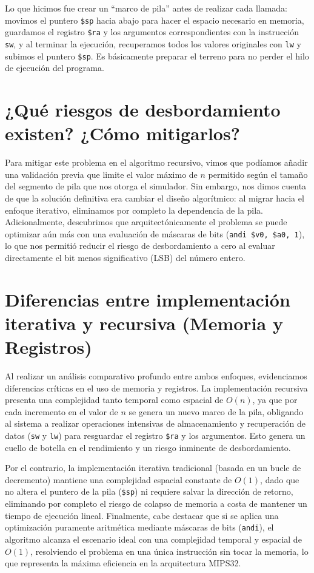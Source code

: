 \documentclass[12pt,letterpaper]{article}
\begin{document}
Lo que hicimos fue crear un ``marco de pila'' antes de realizar cada llamada: movimos el puntero \texttt{\$sp} hacia abajo para hacer el espacio necesario en memoria, guardamos el registro \texttt{\$ra} y los argumentos correspondientes con la instrucción \texttt{sw}, y al terminar la ejecución, recuperamos todos los valores originales con \texttt{lw} y subimos el puntero \texttt{\$sp}. Es básicamente preparar el terreno para no perder el hilo de ejecución del programa.

\section{¿Qué riesgos de desbordamiento existen? ¿Cómo mitigarlos?}
Para mitigar este problema en el algoritmo recursivo, vimos que podíamos añadir una validación previa que limite el valor máximo de $n$ permitido según el tamaño del segmento de pila que nos otorga el simulador. Sin embargo, nos dimos cuenta de que la solución definitiva era cambiar el diseño algorítmico: al migrar hacia el enfoque iterativo, eliminamos por completo la dependencia de la pila. Adicionalmente, descubrimos que arquitectónicamente el problema se puede optimizar aún más con una evaluación de máscaras de bits (\texttt{andi \$v0, \$a0, 1}), lo que nos permitió reducir el riesgo de desbordamiento a cero al evaluar directamente el bit menos significativo (LSB) del número entero.

\section{Diferencias entre implementación iterativa y recursiva (Memoria y Registros)}
Al realizar un análisis comparativo profundo entre ambos enfoques, evidenciamos diferencias críticas en el uso de memoria y registros. La implementación recursiva presenta una complejidad tanto temporal como espacial de $O(n)$, ya que por cada incremento en el valor de $n$ se genera un nuevo marco de la pila, obligando al sistema a realizar operaciones intensivas de almacenamiento y recuperación de datos (\texttt{sw} y \texttt{lw}) para resguardar el registro \texttt{\$ra} y los argumentos. Esto genera un cuello de botella en el rendimiento y un riesgo inminente de desbordamiento.

Por el contrario, la implementación iterativa tradicional (basada en un bucle de decremento) mantiene una complejidad espacial constante de $O(1)$, dado que no altera el puntero de la pila (\texttt{\$sp}) ni requiere salvar la dirección de retorno, eliminando por completo el riesgo de colapso de memoria a costa de mantener un tiempo de ejecución lineal. Finalmente, cabe destacar que si se aplica una optimización puramente aritmética mediante máscaras de bits (\texttt{andi}), el algoritmo alcanza el escenario ideal con una complejidad temporal y espacial de $O(1)$, resolviendo el problema en una única instrucción sin tocar la memoria, lo que representa la máxima eficiencia en la arquitectura MIPS32.
\end{document}
